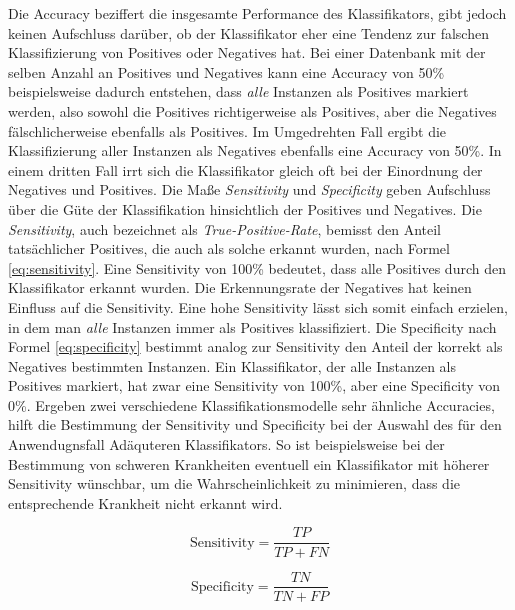 Die Accuracy beziffert die insgesamte Performance des Klassifikators, gibt jedoch keinen Aufschluss darüber, ob der Klassifikator eher eine Tendenz zur falschen Klassifizierung von Positives oder Negatives hat. Bei einer Datenbank mit der selben Anzahl an Positives und Negatives kann eine Accuracy von 50\% beispielsweise dadurch entstehen, dass \emph{alle} Instanzen als Positives markiert werden, also sowohl die Positives richtigerweise als Positives, aber die Negatives fälschlicherweise ebenfalls als Positives. Im Umgedrehten Fall ergibt die Klassifizierung aller Instanzen als Negatives ebenfalls eine Accuracy von 50\%. In einem dritten Fall irrt sich die Klassifikator gleich oft bei der Einordnung der Negatives und Positives. Die Maße \emph{Sensitivity} und \emph{Specificity} geben Aufschluss über die Güte der Klassifikation hinsichtlich der Positives und Negatives. Die \emph{Sensitivity}, auch bezeichnet als \emph{True-Positive-Rate}, bemisst den Anteil tatsächlicher Positives, die auch als solche erkannt wurden, nach Formel \ref{eq:sensitivity}. Eine Sensitivity von 100\% bedeutet, dass alle Positives durch den Klassifikator erkannt wurden. Die Erkennungsrate der Negatives hat keinen Einfluss auf die Sensitivity. Eine hohe Sensitivity lässt sich somit \glqq einfach\grqq{} erzielen, in dem man \emph{alle} Instanzen immer als Positives klassifiziert. Die Specificity nach Formel \ref{eq:specificity} bestimmt analog zur Sensitivity den Anteil der korrekt als Negatives bestimmten Instanzen. Ein Klassifikator, der alle Instanzen als Positives markiert, hat zwar eine Sensitivity von 100\%, aber eine Specificity von 0\%. Ergeben zwei verschiedene Klassifikationsmodelle sehr ähnliche Accuracies, hilft die Bestimmung der Sensitivity und Specificity bei der Auswahl des für den Anwendugnsfall Adäquteren Klassifikators. So ist beispielsweise bei der Bestimmung von schweren Krankheiten eventuell ein Klassifikator mit höherer Sensitivity wünschbar, um die Wahrscheinlichkeit zu minimieren, dass die entsprechende Krankheit nicht erkannt wird. \cite{sens-and_spec}  \cite[S. 222]{machine_kubat}

\begin{equation}
\text{Sensitivity} = \frac{TP}{TP+FN}
\label{eq:sensitivity}
\end{equation}

\begin{equation}
\text{Specificity} = \frac{TN}{TN+FP}
\label{eq:specificity}
\end{equation}
